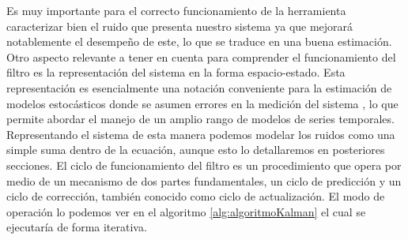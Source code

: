 Es muy importante para el correcto funcionamiento de la herramienta caracterizar bien el ruido que presenta nuestro sistema ya que mejorará notablemente el desempeño de este, lo que se traduce en una buena estimación. 
Otro aspecto relevante a tener en cuenta para comprender el funcionamiento del filtro es la representación del sistema en la forma espacio-estado.
Esta representación es esencialmente una notación conveniente para la estimación de modelos estocásticos donde se asumen errores en la medición del sistema , lo que permite abordar el manejo de un amplio rango de modelos de series temporales. 
%
%
%
%
%
%
%
%
%
Representando el sistema de esta manera podemos modelar los ruidos como una simple suma dentro de la ecuación, aunque esto lo detallaremos en posteriores secciones. 
El ciclo de funcionamiento del filtro  es un procedimiento que opera por medio de un mecanismo de dos partes fundamentales, un ciclo de predicción y un ciclo de corrección, también conocido como ciclo de actualización. 
%
%
%
El modo de operación lo podemos ver en el algoritmo \ref{alg:algoritmoKalman} el cual se ejecutaría de forma iterativa. 

